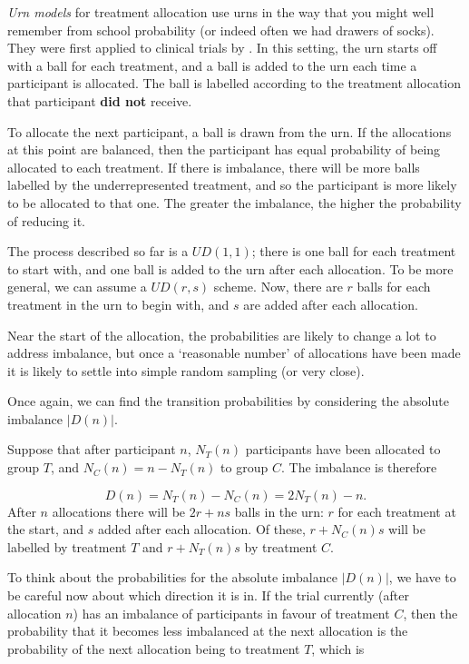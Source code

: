 \documentclass[
  openany]{book}
\theoremstyle{definition}
\theoremstyle{definition}
\theoremstyle{definition}
\theoremstyle{definition}
\theoremstyle{remark}
\begin{document}
\emph{Urn models} for treatment allocation use urns in the way that you might well remember from school probability (or indeed often we had drawers of socks). They were first applied to clinical trials by \citet{wei1978application}. In this setting, the urn starts off with a ball for each treatment, and a ball is added to the urn each time a participant is allocated. The ball is labelled according to the treatment allocation that participant \textbf{did not} receive.

To allocate the next participant, a ball is drawn from the urn. If the allocations at this point are balanced, then the participant has equal probability of being allocated to each treatment. If there is imbalance, there will be more balls labelled by the underrepresented treatment, and so the participant is more likely to be allocated to that one. The greater the imbalance, the higher the probability of reducing it.

The process described so far is a \(UD\left(1,1\right)\); there is one ball for each treatment to start with, and one ball is added to the urn after each allocation. To be more general, we can assume a \(UD\left(r,s\right)\) scheme. Now, there are \(r\) balls for each treatment in the urn to begin with, and \(s\) are added after each allocation.

Near the start of the allocation, the probabilities are likely to change a lot to address imbalance, but once a `reasonable number' of allocations have been made it is likely to settle into simple random sampling (or very close).

Once again, we can find the transition probabilities by considering the absolute imbalance \(\lvert D\left(n\right) \rvert\).

Suppose that after participant \(n\), \(N_T\left(n\right)\) participants have been allocated to group \(T\), and \(N_C\left(n\right) = n - N_T\left(n\right)\) to group \(C\). The imbalance is therefore

\[D\left(n\right) = N_T\left(n\right) - N_C\left(n\right) = 2N_T\left(n\right) - n.\]
After \(n\) allocations there will be \(2r + ns\) balls in the urn: \(r\) for each treatment at the start, and \(s\) added after each allocation. Of these, \(r + N_C\left(n\right)s\) will be labelled by treatment \(T\) and \(r + N_T\left(n\right)s\) by treatment \(C\).

To think about the probabilities for the absolute imbalance \(\lvert D\left(n\right)\rvert\), we have to be careful now about which direction it is in. If the trial currently (after allocation \(n\)) has an imbalance of participants in favour of treatment \(C\), then the probability that it becomes less imbalanced at the next allocation is the probability of the next allocation being to treatment \(T\), which is
\end{document}
